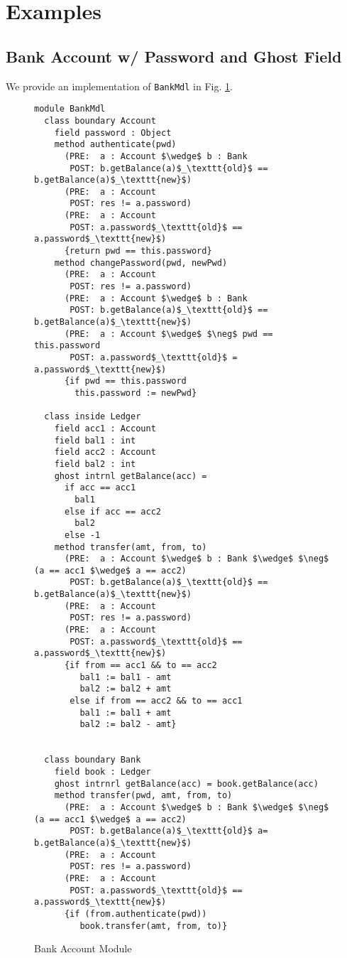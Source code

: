 \newpage

\section{Examples}

\subsection{Bank Account w/ Password and Ghost Field}
We provide an implementation of \texttt{BankMdl} in Fig. \ref{f:ex-bank}.
\begin{figure}[t]
\begin{lstlisting}[mathescape=true, frame=lines]
module BankMdl
  class boundary Account
    field password : Object
    method authenticate(pwd)
      (PRE:  a : Account $\wedge$ b : Bank
       POST: b.getBalance(a)$_\texttt{old}$ == b.getBalance(a)$_\texttt{new}$)
      (PRE:  a : Account
       POST: res != a.password)
      (PRE:  a : Account
       POST: a.password$_\texttt{old}$ == a.password$_\texttt{new}$)
      {return pwd == this.password}
    method changePassword(pwd, newPwd)
      (PRE:  a : Account
       POST: res != a.password)
      (PRE:  a : Account $\wedge$ b : Bank
       POST: b.getBalance(a)$_\texttt{old}$ == b.getBalance(a)$_\texttt{new}$)
      (PRE:  a : Account $\wedge$ $\neg$ pwd == this.password
       POST: a.password$_\texttt{old}$ = a.password$_\texttt{new}$)
      {if pwd == this.password
        this.password := newPwd}

  class inside Ledger
    field acc1 : Account
    field bal1 : int
    field acc2 : Account
    field bal2 : int
    ghost intrnl getBalance(acc) = 
      if acc == acc1
        bal1
      else if acc == acc2
        bal2
      else -1
    method transfer(amt, from, to)
      (PRE:  a : Account $\wedge$ b : Bank $\wedge$ $\neg$ (a == acc1 $\wedge$ a == acc2)
       POST: b.getBalance(a)$_\texttt{old}$ == b.getBalance(a)$_\texttt{new}$)
      (PRE:  a : Account
       POST: res != a.password)
      (PRE:  a : Account
       POST: a.password$_\texttt{old}$ == a.password$_\texttt{new}$)
      {if from == acc1 && to == acc2
         bal1 := bal1 - amt
         bal2 := bal2 + amt
       else if from == acc2 && to == acc1
         bal1 := bal1 + amt
         bal2 := bal2 - amt}
      

  class boundary Bank
    field book : Ledger
    ghost intrnrl getBalance(acc) = book.getBalance(acc)
    method transfer(pwd, amt, from, to)
      (PRE:  a : Account $\wedge$ b : Bank $\wedge$ $\neg$ (a == acc1 $\wedge$ a == acc2)
       POST: b.getBalance(a)$_\texttt{old}$ a= b.getBalance(a)$_\texttt{new}$)
      (PRE:  a : Account
       POST: res != a.password)
      (PRE:  a : Account
       POST: a.password$_\texttt{old}$ == a.password$_\texttt{new}$)
      {if (from.authenticate(pwd))
         book.transfer(amt, from, to)}
\end{lstlisting}
\caption{Bank Account Module}
\label{f:ex-bank}
\end{figure}
